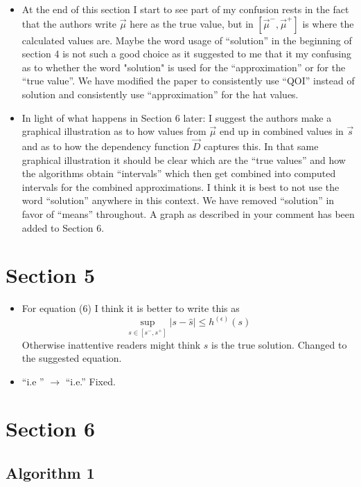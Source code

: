 \documentclass{article}[12pt]
\newcommand{\Referee}[1]{{\color{blue} #1 \newline}}
\begin{document}
\begin{itemize}
    \item \Referee{At the end of this section I start to see part of my confusion rests in the fact that the authors write $\vec{\mu}$ here as the true value, but in $[\vec{\mu}^-, \vec{\mu}^+]$ is where the calculated values are. Maybe the word usage of ``solution'' in the beginning of section 4 is not such a good choice as it suggested to me that it my confusing as to whether the word "solution" is used for the ``approximation'' or for the ``true value''.}We have modified the paper to consistently use ``QOI'' instead of solution and consistently use ``approximation'' for the hat values. 
    \item \Referee{In light of what happens in Section 6 later: I suggest the authors make a graphical illustration as to how values from $\vec{\mu}$ end up in combined values in $\vec{s}$ and as to how the dependency function $\vec{D}$ captures this. In that same graphical illustration it should be clear which are the ``true values'' and how the algorithms obtain ``intervals'' which then get combined into computed intervals for the combined approximations. I think it is best to not use the word ``solution'' anywhere in this context.}We have removed ``solution'' in favor of ``means'' throughout. A graph as described in your comment has been added to Section 6.
\end{itemize}

\section*{Section 5}

\begin{itemize}
    \item \Referee{For equation (6) I think it is better to write this as
    $$\sup_{s \in [s^-, s^+]} |s - \hat{s}| \le h^{(\epsilon)}(s)$$
  Otherwise inattentive readers might think $s$ is the true solution.}Changed to the suggested equation. 
  \item \Referee{``i.e '' $\to$ ``i.e.''}Fixed.
\end{itemize}

\section*{Section 6}

\subsection*{Algorithm 1}
\end{document}
